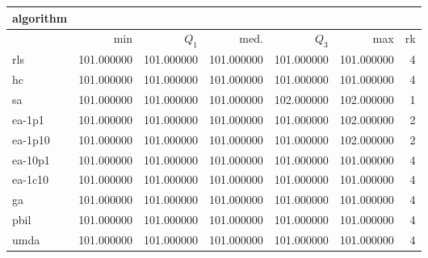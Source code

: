 \begin{tabular}{@{}l*{5}{>{{}}N{3}{0}}>{{}}N{2}{0}@{}}
\toprule
{algorithm} &  \\
\midrule
& {min} & {$Q_1$} & {med.} & {$Q_3$} & {max} & {rk}\\
\midrule
rls & {\color{blue}} 101.000000 & {\color{blue}} 101.000000 & {\color{blue}} 101.000000 & 101.000000 & 101.000000 & 4\\
hc & {\color{blue}} 101.000000 & {\color{blue}} 101.000000 & {\color{blue}} 101.000000 & 101.000000 & 101.000000 & 4\\
sa & {\color{blue}} 101.000000 & {\color{blue}} 101.000000 & {\color{blue}} 101.000000 & {\color{blue}} 102.000000 & {\color{blue}} 102.000000 & 1\\
ea-1p1 & {\color{blue}} 101.000000 & {\color{blue}} 101.000000 & {\color{blue}} 101.000000 & 101.000000 & {\color{blue}} 102.000000 & 2\\
ea-1p10 & {\color{blue}} 101.000000 & {\color{blue}} 101.000000 & {\color{blue}} 101.000000 & 101.000000 & {\color{blue}} 102.000000 & 2\\
ea-10p1 & {\color{blue}} 101.000000 & {\color{blue}} 101.000000 & {\color{blue}} 101.000000 & 101.000000 & 101.000000 & 4\\
ea-1c10 & {\color{blue}} 101.000000 & {\color{blue}} 101.000000 & {\color{blue}} 101.000000 & 101.000000 & 101.000000 & 4\\
ga & {\color{blue}} 101.000000 & {\color{blue}} 101.000000 & {\color{blue}} 101.000000 & 101.000000 & 101.000000 & 4\\
pbil & {\color{blue}} 101.000000 & {\color{blue}} 101.000000 & {\color{blue}} 101.000000 & 101.000000 & 101.000000 & 4\\
umda & {\color{blue}} 101.000000 & {\color{blue}} 101.000000 & {\color{blue}} 101.000000 & 101.000000 & 101.000000 & 4\\
\bottomrule
\end{tabular}
